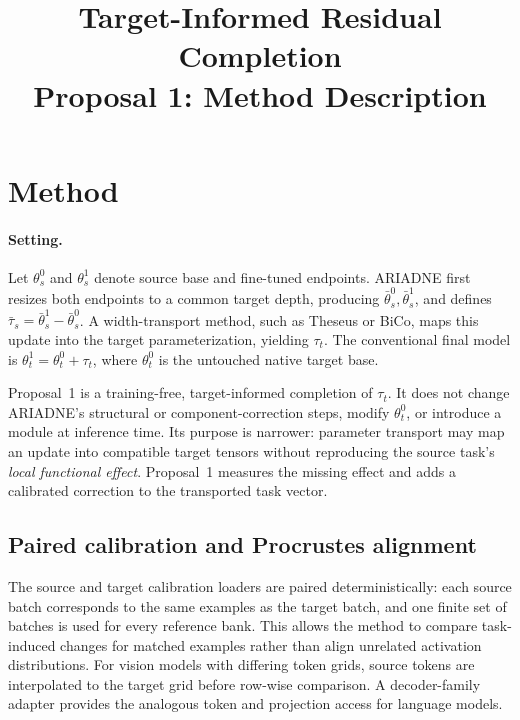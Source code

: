 \documentclass[10pt]{article}
\title{Target-Informed Residual Completion\\\large Proposal 1: Method Description}
\author{}
\date{}
\begin{document}
\maketitle

\section{Method}
\paragraph{Setting.}
Let $\theta_s^0$ and $\theta_s^1$ denote source base and fine-tuned endpoints. ARIADNE first resizes both endpoints to a common target depth, producing $\bar\theta_s^0,\bar\theta_s^1$, and defines $\bar\tau_s=\bar\theta_s^1-\bar\theta_s^0$. A width-transport method, such as Theseus or BiCo, maps this update into the target parameterization, yielding $\tau_t$. The conventional final model is $\theta_t^1=\theta_t^0+\tau_t$, where $\theta_t^0$ is the untouched native target base.

Proposal~1 is a training-free, target-informed completion of $\tau_t$. It does not change ARIADNE's structural or component-correction steps, modify $\theta_t^0$, or introduce a module at inference time. Its purpose is narrower: parameter transport may map an update into compatible target tensors without reproducing the source task's \emph{local functional effect}. Proposal~1 measures the missing effect and adds a calibrated correction to the transported task vector.

\subsection{Paired calibration and Procrustes alignment}
The source and target calibration loaders are paired deterministically: each source batch corresponds to the same examples as the target batch, and one finite set of batches is used for every reference bank. This allows the method to compare task-induced changes for matched examples rather than align unrelated activation distributions. For vision models with differing token grids, source tokens are interpolated to the target grid before row-wise comparison. A decoder-family adapter provides the analogous token and projection access for language models.
\end{document}
